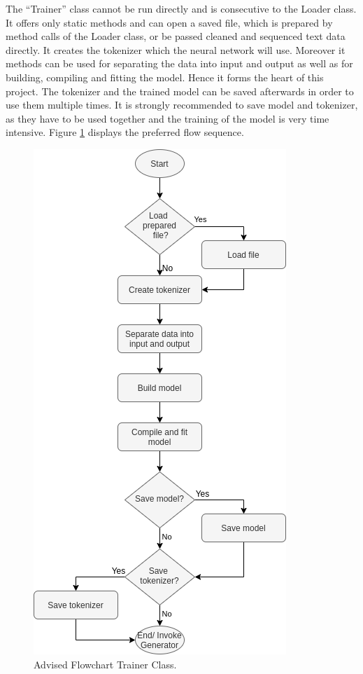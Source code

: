 \documentclass[conference]{IEEEtran}
\begin{document}
The ``Trainer'' class cannot be run directly and is consecutive to the Loader class. It offers only static methods and can open a saved file, which is prepared by method calls of the Loader class, or be passed cleaned and sequenced text data directly. It creates the tokenizer which the neural network will use. Moreover it methods can be used for separating the data into input and output as well as for building, compiling and fitting the model. Hence it forms the heart of this project. The tokenizer and the trained model can be saved afterwards in order to use them multiple times. It is strongly recommended to save model and tokenizer, as they have to be used together and the training of the model is very time intensive. Figure \ref{fig:flowchart_trainer} displays the preferred flow sequence.

\begin{figure}[htbp]
\centerline{\includegraphics[scale=0.65]{pictures/flowchart_trainer.png}}
\caption{Advised Flowchart Trainer Class.}
\label{fig:flowchart_trainer}
\end{figure}
\end{document}
